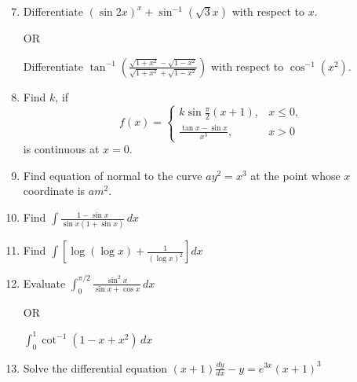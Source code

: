 \documentclass[12pt]{article}
\begin{document}
\begin{enumerate}
    \setcounter{enumi}{6} %
    \item Differentiate $(\sin 2x)^x + \sin^{-1}(\sqrt{3}x)$ with respect to $x$.  

    OR  

    Differentiate $\tan^{-1}\left(\frac{\sqrt{1+x^2}-\sqrt{1-x^2}}{\sqrt{1+x^2}+\sqrt{1-x^2}}\right)$ with respect to $\cos^{-1}(x^2)$.

    \item Find $k$, if  
    \[
    f(x)=
    \begin{cases}
    k \sin \tfrac{\pi}{2}(x+1), & x \leq 0, \\[6pt]
    \tfrac{\tan x - \sin x}{x^3}, & x > 0
    \end{cases}
    \]
    is continuous at $x=0$.

    \item Find equation of normal to the curve $ay^2=x^3$ at the point whose $x$ coordinate is $am^2$.

    \item Find $\int \frac{1-\sin x}{\sin x(1+\sin x)} \, dx$

    \item Find $\int \left[\log(\log x)+\frac{1}{(\log x)^2}\right] dx$

    \item Evaluate $\int_{0}^{\pi/2} \frac{\sin^2 x}{\sin x + \cos x} \, dx$  

    OR  

    $\int_{0}^{1} \cot^{-1}(1-x+x^2) \, dx$

    \item Solve the differential equation $(x+1)\frac{dy}{dx} - y = e^{3x}(x+1)^3$
\end{enumerate}
\end{document}
